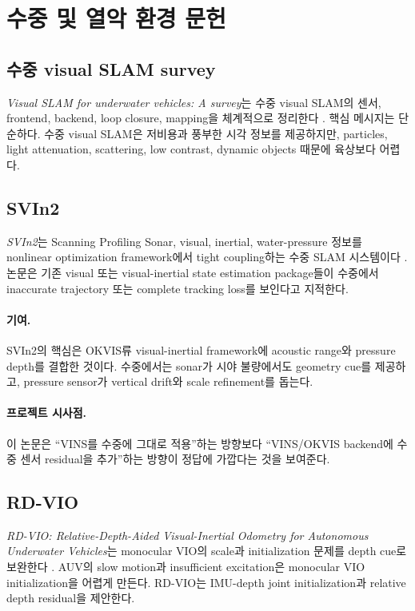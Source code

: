 \documentclass[11pt,a4paper]{article}
\newcommand{\paper}[1]{\textit{#1}}
\begin{document}
\section{수중 및 열악 환경 문헌}

\subsection{수중 visual SLAM survey}

\paper{Visual SLAM for underwater vehicles: A survey}는 수중 visual SLAM의 센서, frontend, backend, loop closure, mapping을 체계적으로 정리한다 \cite{yang2022underwatersurvey}.
핵심 메시지는 단순하다.
수중 visual SLAM은 저비용과 풍부한 시각 정보를 제공하지만, particles, light attenuation, scattering, low contrast, dynamic objects 때문에 육상보다 어렵다.

\subsection{SVIn2}

\paper{SVIn2}는 Scanning Profiling Sonar, visual, inertial, water-pressure 정보를 nonlinear optimization framework에서 tight coupling하는 수중 SLAM 시스템이다 \cite{rahman2022svin2}.
논문은 기존 visual 또는 visual-inertial state estimation package들이 수중에서 inaccurate trajectory 또는 complete tracking loss를 보인다고 지적한다.

\paragraph{기여.}
SVIn2의 핵심은 OKVIS류 visual-inertial framework에 acoustic range와 pressure depth를 결합한 것이다.
수중에서는 sonar가 시야 불량에서도 geometry cue를 제공하고, pressure sensor가 vertical drift와 scale refinement를 돕는다.

\paragraph{프로젝트 시사점.}
이 논문은 ``VINS를 수중에 그대로 적용''하는 방향보다 ``VINS/OKVIS backend에 수중 센서 residual을 추가''하는 방향이 정답에 가깝다는 것을 보여준다.

\subsection{RD-VIO}

\paper{RD-VIO: Relative-Depth-Aided Visual-Inertial Odometry for Autonomous Underwater Vehicles}는 monocular VIO의 scale과 initialization 문제를 depth cue로 보완한다 \cite{li2023rdvio}.
AUV의 slow motion과 insufficient excitation은 monocular VIO initialization을 어렵게 만든다.
RD-VIO는 IMU-depth joint initialization과 relative depth residual을 제안한다.
\end{document}

